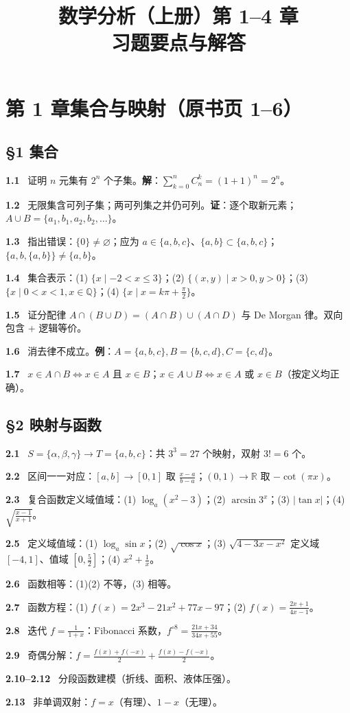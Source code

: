 \documentclass[11pt,a4paper,UTF8]{ctexart}
\title{数学分析（上册）第 1--4 章\\习题要点与解答}
\author{}
\date{}
\newcommand{\R}{\mathbb R}
\newcommand{\qitem}[1]{\par\smallskip\noindent\textbf{#1}\ }
\begin{document}
\maketitle
\tableofcontents\newpage

\section{第 1 章\quad 集合与映射（原书页 1--6）}
\subsection*{§1 集合}
\qitem{1.1} 证明 $n$ 元集有 $2^n$ 个子集。\textbf{解}：$\sum_{k=0}^n C_n^k=(1+1)^n=2^n$。\\
\qitem{1.2} 无限集含可列子集；两可列集之并仍可列。\textbf{证}：逐个取新元素；$A\cup B=\{a_1,b_1,a_2,b_2,\dots\}$。\\
\qitem{1.3} 指出错误：$\{0\}\ne\varnothing$；应为 $a\in\{a,b,c\}$、$\{a,b\}\subset\{a,b,c\}$；$\{a,b,\{a,b\}\}\ne\{a,b\}$。\\
\qitem{1.4} 集合表示：(1) $\{x\mid-2<x\le3\}$；(2) $\{(x,y)\mid x>0,y>0\}$；(3) $\{x\mid0<x<1,x\in\mathbb Q\}$；(4) $\{x\mid x=k\pi+\frac\pi2\}$。\\
\qitem{1.5} 证分配律 $A\cap(B\cup D)=(A\cap B)\cup(A\cap D)$ 与 De Morgan 律。双向包含 + 逻辑等价。\\
\qitem{1.6} 消去律不成立。\textbf{例}：$A=\{a,b,c\},B=\{b,c,d\},C=\{c,d\}$。\\
\qitem{1.7} $x\in A\cap B\Leftrightarrow x\in A$ 且 $x\in B$；$x\in A\cup B\Leftrightarrow x\in A$ 或 $x\in B$（按定义均正确）。

\subsection*{§2 映射与函数}
\qitem{2.1} $S=\{\alpha,\beta,\gamma\}\to T=\{a,b,c\}$：共 $3^3=27$ 个映射，双射 $3!=6$ 个。\\
\qitem{2.2} 区间一一对应：$[a,b]\to[0,1]$ 取 $\frac{x-a}{b-a}$；$(0,1)\to\R$ 取 $-\cot(\pi x)$。\\
\qitem{2.3} 复合函数定义域值域：(1) $\log_a(x^2-3)$；(2) $\arcsin3^x$；(3) $|\tan x|$；(4) $\sqrt{\frac{x-1}{x+1}}$。\\
\qitem{2.5} 定义域值域：(1) $\log_a\sin x$；(2) $\sqrt{\cos x}$；(3) $\sqrt{4-3x-x^2}$ 定义域 $[-4,1]$、值域 $[0,\frac52]$；(4) $x^2+\frac1x$。\\
\qitem{2.6} 函数相等：(1)(2) 不等，(3) 相等。\\
\qitem{2.7} 函数方程：(1) $f(x)=2x^3-21x^2+77x-97$；(2) $f(x)=\frac{2x+1}{4x-1}$。\\
\qitem{2.8} 迭代 $f=\frac1{1+x}$：Fibonacci 系数，$f^{\circ8}=\frac{21x+34}{34x+55}$。\\
\qitem{2.9} 奇偶分解：$f=\frac{f(x)+f(-x)}2+\frac{f(x)-f(-x)}2$。\\
\qitem{2.10--2.12} 分段函数建模（折线、面积、液体压强）。\\
\qitem{2.13} 非单调双射：$f=x$（有理）、$1-x$（无理）。
\end{document}
